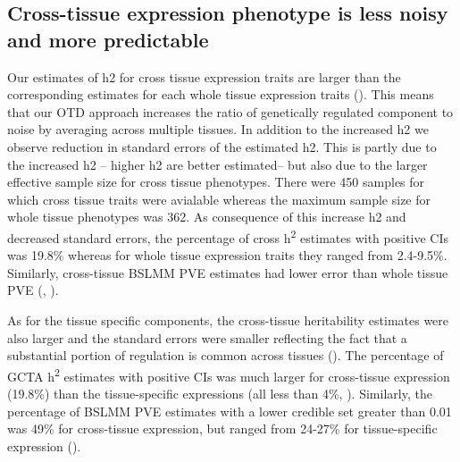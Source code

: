 \documentclass[10pt,letterpaper]{article}
\begin{document}
\subsection*{Cross-tissue expression phenotype is less noisy and more predictable}%


Our estimates of h2 for cross tissue expression traits are larger than the corresponding estimates for each whole tissue expression traits (). %
This means that our OTD approach increases the ratio of genetically regulated component to noise by averaging across multiple tissues. In addition to the increased h2 we observe reduction in standard errors of the estimated h2. This is partly due to the increased h2 -- higher h2 are better estimated-- but also due to the larger effective sample size for cross tissue phenotypes. There were 450 samples for which cross tissue traits were avialable whereas the maximum sample size for whole tissue phenotypes was 362. As consequence of this increase h2 and decreased standard errors, the percentage of cross h\textsuperscript{2} estimates with positive CIs was 19.8\% whereas for whole tissue expression traits they ranged from 2.4-9.5\%. Similarly, cross-tissue BSLMM PVE estimates had lower error than whole tissue PVE (, ). 

As for the tissue specific components, 
the cross-tissue heritability estimates were also larger and the standard errors were smaller reflecting the fact that a substantial portion of regulation is common across tissues (). The percentage of GCTA h\textsuperscript{2} estimates with positive CIs was much larger for cross-tissue expression (19.8\%) than the tissue-specific expressions (all less than 4\%, ). Similarly, the percentage of BSLMM PVE estimates with a lower credible set greater than 0.01 was 49\% for cross-tissue expression, but ranged from 24-27\% for tissue-specific expression ().
\end{document}
